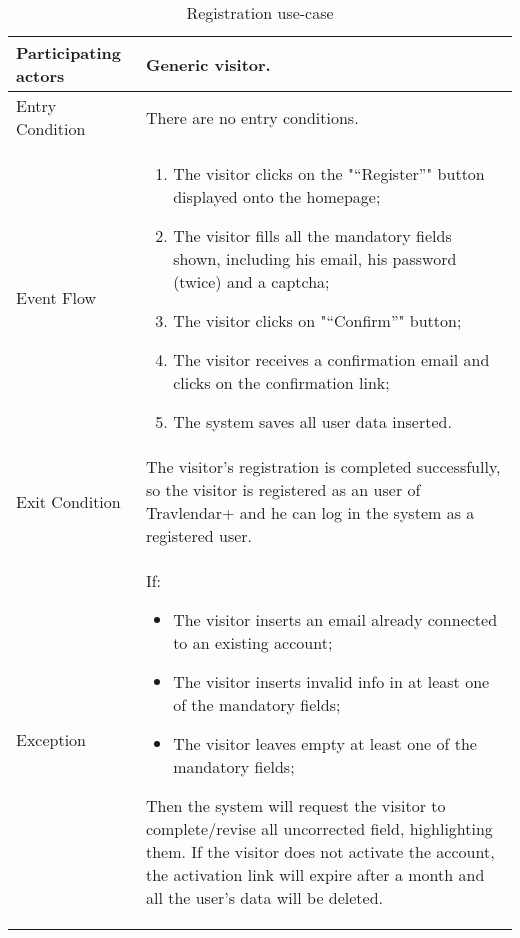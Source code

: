 \begin{table}[H]
	\begin{center}
		\begin{tabular}{ | p{} | p{} | }
		\hline
		Participating actors & Generic visitor.\\
		\hline
		Entry Condition & There are no entry conditions.\\
		\hline
		Event Flow & 
			\begin{enumerate}
				\item The visitor clicks on the "“Register”" button displayed onto the homepage;
				\item The visitor fills all the mandatory fields shown, including his email, his password (twice) and a captcha;
				\item The visitor clicks on "“Confirm”" button;
				\item The visitor receives a confirmation email and clicks on the confirmation link;
				\item The system saves all user data inserted.
			\end{enumerate} \\
		\hline
		Exit Condition & The visitor's registration is completed successfully, so the visitor is registered as an user of Travlendar+ and he can log in the system as a registered user. \\
		\hline
		Exception & If:
				\begin{itemize}
   					\item The visitor inserts an email already connected to an existing account;
   					\item The visitor inserts invalid info in at least one of the mandatory fields;
   					\item The visitor leaves empty at least one of the mandatory fields;
   				\end{itemize}
   		Then the system will request the visitor to complete/revise all uncorrected field, highlighting them.
If the visitor does not activate the account, the activation link will expire after a month and all the user's data will be deleted.\\ 
		\hline
		\end{tabular}
	\end{center}
	\caption{Registration use-case}
\end{table}